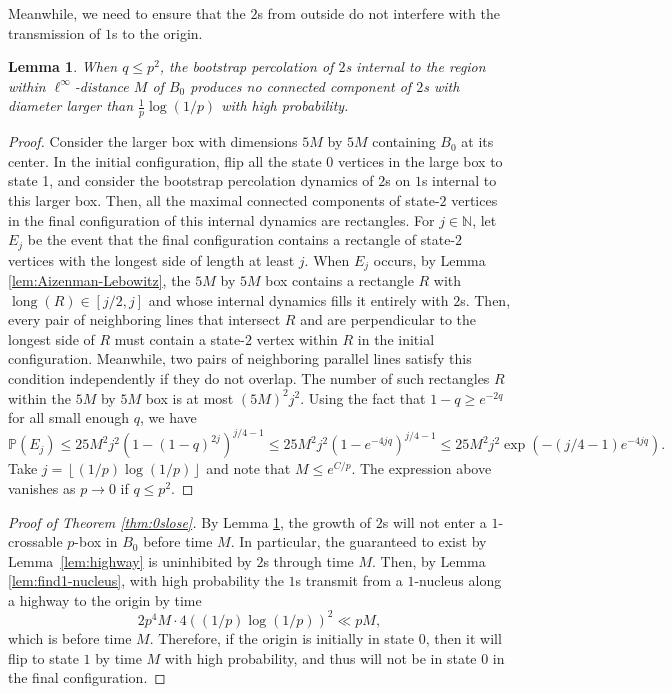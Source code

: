 \documentclass{article}
\renewcommand{\P}{\mathbb{P}}
\newcommand{\floor}[1]{\left\lfloor#1\right \rfloor}
\newcommand{\N}{\mathbb{N}}
\numberwithin{equation}{section}
\newtheorem{lemma}[theorem]{Lemma}
\begin{document}
Meanwhile, we need to ensure that the $2$s from outside do not interfere with the transmission of $1$s to the origin.

\begin{lemma}\label{lem:nointerventionof2s}
    When $q \leq p^2$, the bootstrap percolation of $2$s internal to the region within  $\ell^\infty$-distance $M$ of $B_0$ produces no connected component of $2$s with diameter larger than $\frac{1}{p}\log(1/p)$ with high probability.
\end{lemma}
\begin{proof}
    Consider the larger box with dimensions $5M$ by $5M$ containing $B_0$ at its center.
    In the initial configuration, flip all the state 0 vertices in the large box to state 1, and consider the bootstrap percolation dynamics of $2$s on $1$s internal to this larger box.
    Then, all the maximal connected components of state-$2$ vertices in the final configuration of this internal dynamics are rectangles. 
    For $j \in \N$, let $E_j$ be the event that the final configuration contains a rectangle of state-$2$ vertices with the longest side of length at least $j$.
    When $E_j$ occurs, by Lemma \ref{lem:Aizenman-Lebowitz}, the $5M$ by $5M$ box contains a rectangle $R$ with $\operatorname{long}(R) \in [j/2, j]$ and whose internal dynamics fills it entirely with $2$s.
    Then, every pair of neighboring lines that intersect $R$ and are perpendicular to the longest side of $R$ must contain a state-$2$ vertex within $R$ in the initial configuration.
    Meanwhile, two pairs of neighboring parallel lines satisfy this condition independently if they do not overlap.
    The number of such rectangles $R$ within the $5M$ by $5M$ box is at most $(5M)^2 j^2$.
    Using the fact that $1 - q \geq e^{-2q}$ for all small enough $q$, we have 
    \[
    \P(E_j) \leq 25 M^2 j^2 (1 - (1 - q)^{2j})^{j/4 - 1} 
    \leq
    25 M^2 j^2(1 - e^{-4jq})^{j/4 - 1}
    \leq
    25 M^2 j^2\exp(-(j/4 - 1)e^{-4jq})
    .
    \]
    Take $j = \floor{(1/p)\log(1/p)}$ and note that $M \leq e^{C/p}$.
    The expression above vanishes as $p \to 0$ if $q \leq p^2$.
\end{proof}

\begin{proof}[Proof of Theorem \ref{thm:0slose}]
By Lemma \ref{lem:nointerventionof2s}, the growth of $2$s will not enter a $1$-crossable $p$-box in $B_0$ before time $M$. In particular, the guaranteed to exist by Lemma~\ref{lem:highway} is uninhibited by $2$s through time $M$.
Then, by Lemma \ref{lem:find1-nucleus}, with high probability the $1$s transmit from a $1$-nucleus along a highway to the origin by time 
\[
2p^4 M \cdot 4 ((1/p)\log(1/p))^2 \ll pM,
\]
which is before time $M$. Therefore, if the origin is initially in state $0$, then it will flip to state $1$ by time $M$ with high probability, and thus will not be in state $0$ in the final configuration.
\end{proof}
\end{document}
